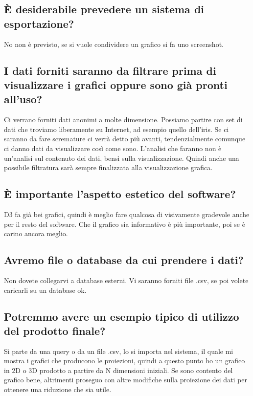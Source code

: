 \documentclass{article}
\begin{document}
    \subsection{È desiderabile prevedere un sistema di esportazione?}
    \label{sub:domanda_09}
    No non è previsto, se si vuole condividere un grafico si fa uno screenshot.
    
    \subsection{I dati forniti saranno da filtrare prima di visualizzare i grafici oppure sono già pronti all'uso?}
    \label{sub:domanda_10}
    Ci verrano forniti dati anonimi a molte dimensione. Possiamo partire con set di dati che troviamo liberamente su Internet, ad esempio quello dell'iris. Se ci saranno da fare scremature ci verrà detto più avanti, tendenzialmente comunque ci danno dati da visualizzare così come sono. L'analisi che faranno non è un'analisi sul contenuto dei dati, bensì sulla visualizzazione. Quindi anche una possibile filtratura sarà sempre finalizzata alla visualizzazione grafica.

    \subsection{È importante l'aspetto estetico del software?}
    \label{sub:domanda_11}
    D3 fa già bei grafici, quindi è meglio fare qualcosa di visivamente gradevole anche per il resto del software. Che il grafico sia informativo è più importante, poi se è carino ancora meglio.

    \subsection{Avremo file o database da cui prendere i dati?}
    \label{sub:domanda_12}
    Non dovete collegarvi a database esterni. Vi saranno forniti file .csv, se poi volete caricarli su un database ok.

    \subsection{Potremmo avere un esempio tipico di utilizzo del prodotto finale?}
    \label{sub:domanda_13}
    Si parte da una query o da un file .csv, lo si importa nel sistema, il quale mi mostra i grafici che producono le proiezioni, quindi a questo punto ho un grafico in 2D o 3D prodotto a partire da N dimensioni iniziali. Se sono contento del grafico bene, altrimenti proseguo con altre modifiche sulla proiezione dei dati per ottenere una riduzione che sia utile.
\end{document}
